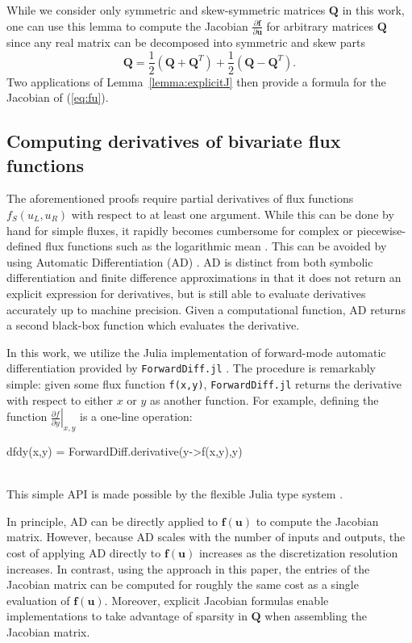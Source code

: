 \documentclass{article}
\newcommand{\pd}[2]{\frac{\partial#1}{\partial#2}}
\newcommand{\LRp}[1]{\left( #1 \right)}
\newcommand{\LRl}[1]{\left. #1 \right|}
\begin{document}
While we consider only symmetric and skew-symmetric matrices $\bm{Q}$ in this work, one can use this lemma to compute the Jacobian $\pd{\bm{f}}{\bm{u}}$ for arbitrary matrices $\bm{Q}$ since any real matrix can be decomposed into symmetric and skew parts
\[
\bm{Q} = \frac{1}{2} \LRp{\bm{Q}+\bm{Q}^T} +  \frac{1}{2} \LRp{\bm{Q}-\bm{Q}^T}.
\]
Two applications of Lemma~\ref{lemma:explicitJ} then provide a formula for the Jacobian of (\ref{eq:fu}).  

\subsection{Computing derivatives of bivariate flux functions}

The aforementioned proofs require partial derivatives of flux functions $f_S(u_L,u_R)$ with respect to at least one argument.  While this can be done by hand for simple fluxes, it rapidly becomes cumbersome for complex or piecewise-defined flux functions such as the logarithmic mean \cite{ismail2009affordable, winters2019entropy}.  This can be avoided by using Automatic Differentiation (AD) \cite{griewank2008evaluating}.  AD is distinct from both symbolic differentiation and finite difference approximations in that it does not return an explicit expression for derivatives, but is still able to evaluate derivatives accurately up to machine precision.  Given a computational function, AD returns a second black-box function which evaluates the derivative.  

In this work, we utilize the Julia implementation of forward-mode automatic differentiation provided by \verb+ForwardDiff.jl+ \cite{RevelsLubinPapamarkou2016}.  The procedure is remarkably simple: given some flux function \verb+f(x,y)+, \verb+ForwardDiff.jl+ returns the derivative with respect to either $x$ or $y$ as another function.  For example, defining the function $\LRl{\pd{f}{y}}_{x,y}$ is a one-line operation:
\begin{verbbox}
dfdy(x,y) = ForwardDiff.derivative(y->f(x,y),y)
\end{verbbox}
\begin{figure}[!h]
\centering
\theverbbox
\end{figure}
\\
This simple API is made possible by the flexible Julia type system  \cite{bezanson2017julia}.  

In principle, AD can be directly applied to $\bm{f}(\bm{u})$ to compute the Jacobian matrix.  However, because AD scales with the number of inputs and outputs, the cost of applying AD directly to $\bm{f}(\bm{u})$ increases as the discretization resolution increases.  In contrast, using the approach in this paper, the entries of the Jacobian matrix can be computed for roughly the same cost as a single evaluation of $\bm{f}(\bm{u})$.  Moreover, explicit Jacobian formulas enable implementations to take advantage of sparsity in $\bm{Q}$ when assembling the Jacobian matrix.  
\end{document}

